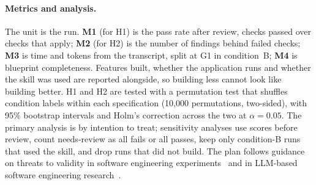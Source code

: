 \documentclass[11pt,a4paper]{article}
\begin{document}
\paragraph{Metrics and analysis.} The unit is the run. \textbf{M1} (for H1) is the pass rate after review, checks
passed over checks that apply; \textbf{M2} (for H2) is the number of findings behind failed checks; \textbf{M3} is time
and tokens from the transcript, split at G1 in condition~B; \textbf{M4} is blueprint completeness. Features built,
whether the application runs and whether the skill was used are reported alongside, so building less cannot look like
building better. H1 and H2 are tested with a permutation test that shuffles condition labels within each specification
(10,000 permutations, two-sided), with 95\% bootstrap intervals and Holm's correction across the two at $\alpha=0.05$.
The primary analysis is by intention to treat; sensitivity analyses use scores before review, count needs-review as all
fails or all passes, keep only condition-B runs that used the skill, and drop runs that did not build. The plan follows
guidance on threats to validity in software engineering experiments~\cite{wohlin2012experimentation} and in LLM-based
software engineering research~\cite{sallou2024breaking}.
\end{document}
